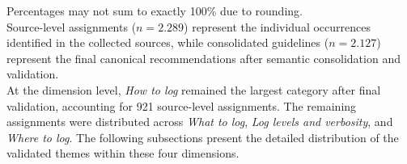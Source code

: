 \begin{table}[H]
    \centering

    \caption{Distribution of source-level guideline occurrences and final
    consolidated guidelines across the four logging dimensions.}

    \label{tab:dimension-distribution}
\end{table}
Percentages may not sum to exactly 100\% due to rounding.
\\ 
Source-level assignments ($n=2.289$) represent the individual occurrences
identified in the collected sources, while consolidated guidelines
($n=2.127$) represent the final canonical recommendations after semantic
consolidation and validation.
\\
At the dimension level, \textit{How to log} remained the largest category after final
validation, accounting for 921 source-level assignments. The remaining assignments
were distributed across \textit{What to log}, \textit{Log levels and verbosity},
and \textit{Where to log}. The following subsections present the detailed
distribution of the validated themes within these four dimensions.

